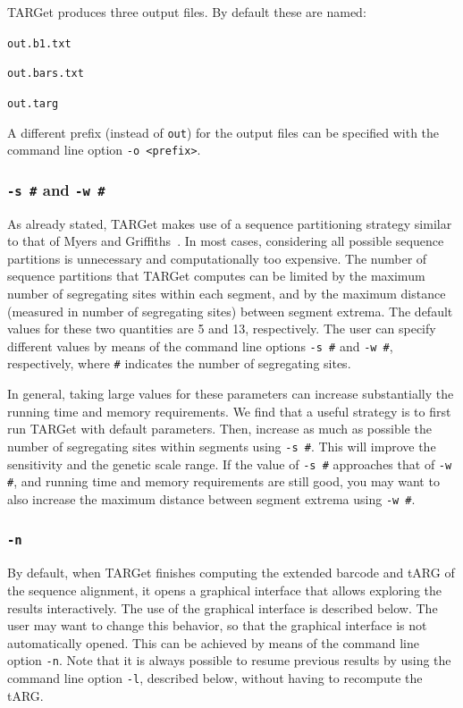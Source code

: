 \documentclass[12pt]{article}
\begin{document}
TARGet produces three output files. By default these are named:

\texttt{out.b1.txt}

\texttt{out.bars.txt} 

\texttt{out.targ}

\noindent A different prefix (instead of \texttt{out}) for the output files can be specified with the command line option \texttt{-o <prefix>}.

\subsubsection*{\texttt{-s \#} and \texttt{-w \#}}

As already stated, TARGet makes use of a sequence partitioning strategy similar to that of Myers and Griffiths~\cite{mg}. In most cases, considering all possible sequence partitions is  unnecessary and computationally too expensive. The number of sequence partitions that TARGet computes can be limited by the maximum number of segregating sites within each segment, and by the maximum distance (measured in number of segregating sites) between segment extrema. The default values for these two quantities are 5 and 13, respectively. The user can specify different values by means of the command line options \texttt{-s \#} and \texttt{-w \#}, respectively, where \texttt{\#} indicates the number of segregating sites.

In general, taking large values for these parameters can increase substantially the running time and memory requirements. We find that a useful strategy is to first run TARGet with default parameters. Then, increase as much as possible the number of segregating sites within segments using \texttt{-s \#}. This will improve the sensitivity and the genetic scale range. If the value of \texttt{-s \#} approaches that of \texttt{-w \#}, and running time and memory requirements are still good, you may want to also increase the maximum distance between segment extrema using \texttt{-w \#}.

\subsubsection*{\texttt{-n}}

By default, when TARGet finishes computing the extended barcode and tARG of the sequence alignment, it opens a graphical interface that allows exploring the results interactively. The use of the graphical interface is described below. The user may want to change this behavior, so that the graphical interface is not automatically opened. This can be achieved by means of the command line option \texttt{-n}. Note that it is always possible to resume previous results by using the command line option \texttt{-l}, described below, without having to recompute the tARG.
\end{document}
